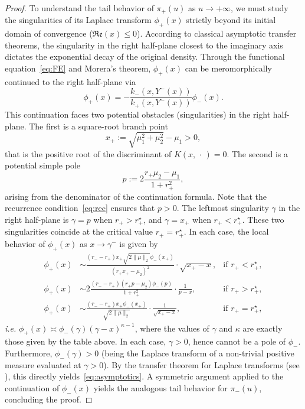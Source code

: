 \documentclass{article}
\theoremstyle{plain}
\theoremstyle{definition}
\theoremstyle{remark}
\begin{document}
\begin{proof}
To understand the tail behavior of $\pi_+(u)$ as $u \to+\infty$, we must study the singularities of its Laplace transform $\phi_+(x)$ strictly beyond its initial domain of convergence ($\mathfrak{Re}(x) \le 0$). According to classical asymptotic transfer theorems, the singularity in the right half-plane closest to the imaginary axis dictates the exponential decay of the original density. Through the functional equation~\eqref{eq:FE} and Morera's theorem, $\phi_+(x)$ can be meromorphically continued to the right half-plane via
$$\phi_+(x)=-\frac{k_-(x,Y^-(x))}{k_+(x,Y^-(x))}\phi_-(x).$$
This continuation faces two potential obstacles (singularities) in the right half-plane. The first is a square-root branch point 
$$x_+ := \sqrt{\mu_1^2 + \mu_2^2} - \mu_1 > 0,$$ 
that is the positive root of the discriminant of $K(x,\,\cdot \,)=0$. The second is a potential simple pole 
$$p := 2 \frac{r_+ \mu_2 - \mu_1}{1 + r_+^2},$$ 
arising from the denominator of the continuation formula.  Note that the recurrence condition~\eqref{eq:rec} ensures that $p>0$. The leftmost singularity $\gamma$ in the right half-plane is $\gamma=p$ when $r_+>r_+^\star$, and $\gamma=x_+$ when $r_+<r_+^\star$. These two singularities coincide at the critical value $r_+=r_+^\star$. In each case, the local behavior of $\phi_+(x)$ as $x\to \gamma^-$ is given by
\begin{align*}
    \phi_+(x)&\sim \frac{(r_--r_+)x_+\sqrt{2\|\mu\|_2}\phi_-(x_+)}{(r_+x_+-\mu_2)^2}\cdot\sqrt{x_+-x},& \text{if }r_+<r_+^\star,\\
    \phi_+(x)&\sim 2\frac{(r_--r_+)(r_+p-\mu_2)\phi_-(p)}{1+r_+^2}\cdot \frac{1}{p-x},&\text{if }r_+>r_+^\star,\\
    \phi_+(x)&\sim \frac{(r_--r_+)x_+\phi_-(x_+)}{\sqrt{2\|\mu\|_2}}\cdot\frac{1}{\sqrt{x_+-x}},&\text{if }r_+=r_+^\star,
\end{align*}
\textit{i.e.} $\phi_+(x)\asymp \phi_-(\gamma)(\gamma-x)^{\kappa-1}$, where the values of $\gamma$ and $\kappa$ are exactly those given by the table above. In each case, $\gamma>0$, hence cannot be a pole of $\phi_-$. Furthermore, $\phi_-(\gamma)>0$ (being the Laplace transform of a non-trivial positive measure evaluated at $\gamma>0$). By the transfer theorem for Laplace transforms (see \cite[Thm.~37.1]{doetsch}), this directly yields~\eqref{eq:asymptotics}. A symmetric argument applied to the continuation of $\phi_-(x)$ yields the analogous tail behavior for $\pi_-(u)$, concluding the proof.
\end{proof}
\end{document}
